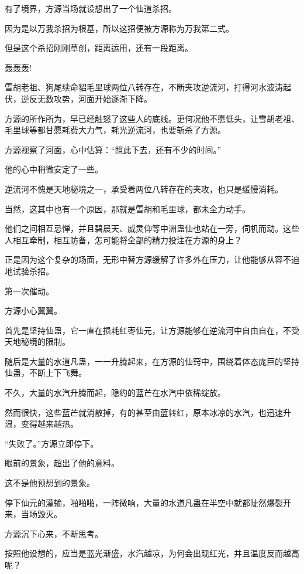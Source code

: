 
\begin{this_body}

有了境界，方源当场就设想出了一个仙道杀招。

因为是以万我杀招为根基，所以这招便被方源称为万我第二式。

但是这个杀招刚刚草创，距离运用，还有一段距离。

轰轰轰!

雪胡老祖、狗尾续命貂毛里球两位八转存在，不断夹攻逆流河，打得河水波涛起伏，逆反无数攻势，河面开始逐渐下降。

方源的所作所为，早已经触怒了这些人的底线。更何况他不愿低头，让雪胡老祖、毛里球等都甘愿耗费大力气，耗光逆流河，也要斩杀了方源。

方源视察了河面，心中估算：“照此下去，还有不少的时间。”

他的心中稍微安定了一些。

逆流河不愧是天地秘境之一，承受着两位八转存在的夹攻，也只是缓慢消耗。

当然，这其中也有一个原因，那就是雪胡和毛里球，都未全力动手。

他们之间相互忌惮，并且碧晨天、威灵仰等中洲蛊仙也站在一旁，伺机而动。这些人相互牵制，相互防备，怎可能将全部的精力投注在方源的身上？

正是因为这个复杂的场面，无形中替方源缓解了许多外在压力，让他能够从容不迫地试验杀招。

第一次催动。

方源小心翼翼。

首先是坚持仙蛊，它一直在损耗红枣仙元，让方源能够在逆流河中自由自在，不受天地秘境的限制。

随后是大量的水道凡蛊，一一升腾起来，在方源的仙窍中，围绕着体态庞巨的坚持仙蛊，不断上下飞舞。

不久，大量的水汽升腾而起，隐约的蓝芒在水汽中依稀绽放。

然而很快，这些蓝芒就消散掉，有的甚至由蓝转红，原本冰凉的水汽，也迅速升温，变得越来越热。

“失败了。”方源立即停下。

眼前的景象，超出了他的意料。

这不是他预想到的景象。

停下仙元的灌输，啪啪啪，一阵微响，大量的水道凡蛊在半空中就都陡然爆裂开来，当场毁灭。

方源沉下心来，不断思考。

按照他设想的，应当是蓝光渐盛，水汽越凉，为何会出现红光，并且温度反而越高呢？


\end{this_body}
